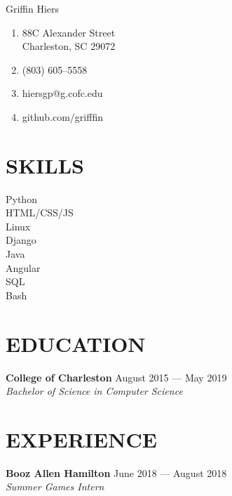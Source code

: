 \documentclass[letterpaper,14pt]{extarticle}
\begin{document}
\begin{multicols}{2}
  \vspace*{30px}
  \huge {Grif\phantom{}f\phantom{}in Hiers}
  \normalsize \\

  \begin{enumerate}[noitemsep]
    \item[]{\faHome{} 88C Alexander Street\\Charleston, SC 29072}
    \item[]{\faPhone{} (803) 605--5558}
    \item[]{\faEnvelope{} hiersgp@g.cofc.edu}
    \item[]{\faGithub{} github.com/grifffin}
  \end{enumerate}
\end{multicols}
\vspace*{13pt}

\section*{SKILLS}
\begin{multicols}{4}
  Python\\
  HTML/CSS/JS\\
  Linux\\
  Django\\
  Java\\
  Angular\\
  SQL\\
  Bash\\
\end{multicols}
\section*{EDUCATION}
  \textbf{College of Charleston}
  \hspace*{\fill}
  \textcolor{color2}{August 2015 --- May 2019}
  \\
  \textcolor{color2}{
    \textit{
      \qquad{} Bachelor of Science in Computer Science
    }
  }
\section*{EXPERIENCE}
\textbf{Booz Allen Hamilton}
  \hspace*{\fill}
  \textcolor{color2}{June 2018 --- August 2018}
  \\ 
  \textcolor{color2}{
    \textit{
      \qquad{} Summer Games Intern
    }
  }
\end{document}

